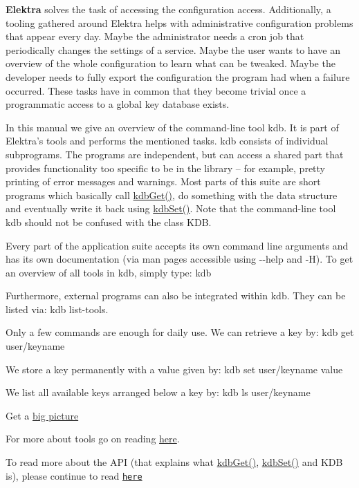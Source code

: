{\bfseries Elektra} solves the task of accessing the configuration access. Additionally, a tooling gathered around Elektra helps with administrative configuration problems that appear every day. Maybe the administrator needs a cron job that periodically changes the settings of a service. Maybe the user wants to have an overview of the whole configuration to learn what can be tweaked. Maybe the developer needs to fully export the configuration the program had when a failure occurred. These tasks have in common that they become trivial once a programmatic access to a global key database exists.

In this manual we give an overview of the command-\/line tool {\ttfamily kdb}. It is part of Elektra's tools and performs the mentioned tasks. {\ttfamily kdb} consists of individual subprograms. The programs are independent, but can access a shared part that provides functionality too specific to be in the library -- for example, pretty printing of error messages and warnings. Most parts of this suite are short programs which basically call {\ttfamily \hyperlink{group__kdb_ga28e385fd9cb7ccfe0b2f1ed2f62453a1}{kdb\+Get()}}, do something with the data structure and eventually write it back using {\ttfamily \hyperlink{group__kdb_ga11436b058408f83d303ca5e996832bcf}{kdb\+Set()}}. Note that the command-\/line tool {\ttfamily kdb} should not be confused with the class {\ttfamily K\+D\+B}.

Every part of the application suite accepts its own command line arguments and has its own documentation (via man pages accessible using {\ttfamily -\/-\/help} and {\ttfamily -\/\+H}). To get an overview of all tools in {\ttfamily kdb}, simply type\+: {\ttfamily kdb}

Furthermore, external programs can also be integrated within {\ttfamily kdb}. They can be listed via\+: {\ttfamily kdb list-\/tools}.

Only a few commands are enough for daily use. We can retrieve a key by\+: {\ttfamily kdb get user/keyname}

We store a key permanently with a value given by\+: {\ttfamily kdb set user/keyname value}

We list all available keys arranged below a key by\+: {\ttfamily kdb ls user/keyname}


\begin{DoxyItemize}
\item Get a \hyperlink{doc_BIGPICTURE_md}{big picture}
\item For more about tools go on reading \hyperlink{md_doc_help_kdb_doc_help_kdb_md}{here}.
\item To read more about the A\+P\+I (that explains what {\ttfamily \hyperlink{group__kdb_ga28e385fd9cb7ccfe0b2f1ed2f62453a1}{kdb\+Get()}}, {\ttfamily \hyperlink{group__kdb_ga11436b058408f83d303ca5e996832bcf}{kdb\+Set()}} and {\ttfamily K\+D\+B} is), please continue to read \href{http://doc.libelektra.org/api/current/html}{\tt here} 
\end{DoxyItemize}